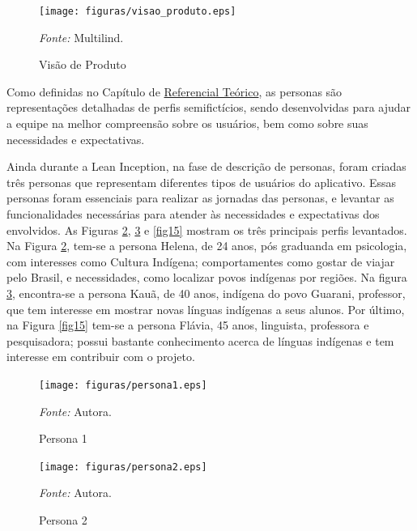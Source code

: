 \begin{figure}[h!]
	\centering
	\caption{Visão de Produto}
	\begin{adjustbox}{center}
		\texttt{[image: figuras/visao\_produto.eps]}
	\end{adjustbox}
	\begin{tablenotes}[flushleft]
		\centering
		\item \textit{Fonte:} Multilind.
	\end{tablenotes}
	\label{fig11}
\end{figure}

Como definidas no Capítulo de \hyperref[chap:Referencial]{Referencial Teórico}, as personas são representações detalhadas de perfis semifictícios, sendo desenvolvidas para ajudar a equipe na melhor compreensão sobre os usuários, bem 
como sobre suas necessidades e expectativas. 

Ainda durante a Lean Inception, na fase de descrição de personas, foram criadas três personas que representam diferentes tipos de usuários do aplicativo. Essas personas foram essenciais para realizar as jornadas das personas, e levantar as 
funcionalidades necessárias para atender às necessidades e expectativas dos envolvidos. As Figuras \ref{fig13}, \ref{fig14} e \ref{fig15} mostram os três principais perfis levantados.  Na Figura \ref{fig13}, tem-se a persona Helena, de 24 anos, pós 
graduanda em psicologia, com interesses como Cultura Indígena; comportamentes como gostar de viajar pelo Brasil, e necessidades, como localizar povos indígenas por regiões. Na figura \ref{fig14}, encontra-se a persona Kauã, de 40 anos, indígena do povo 
Guarani, professor, que tem interesse em mostrar novas línguas indígenas a seus alunos. Por último, na Figura \ref{fig15} tem-se a persona Flávia, 45 anos, linguista, professora e pesquisadora; possui bastante conhecimento acerca de línguas indígenas e 
tem interesse em contribuir com o projeto.

\begin{figure}[h!]
	\centering
	\caption{Persona 1}
	\begin{adjustbox}{center}
		\texttt{[image: figuras/persona1.eps]}
	\end{adjustbox}
	\begin{tablenotes}[flushleft]
		\centering
		\item \textit{Fonte:} Autora.
	\end{tablenotes}
	\label{fig13}
\end{figure}

\begin{figure}[h!]
	\centering
	\caption{Persona 2}
	\begin{adjustbox}{center}
		\texttt{[image: figuras/persona2.eps]}
	\end{adjustbox}
	\begin{tablenotes}[flushleft]
		\centering
		\item \textit{Fonte:} Autora.
	\end{tablenotes}
	\label{fig14}
\end{figure}

